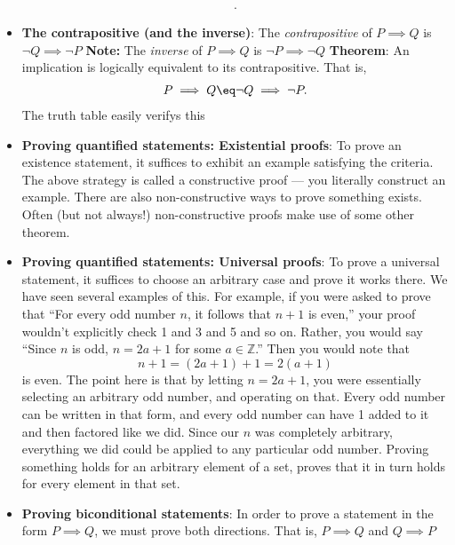\documentclass{report}
\begin{document}
\begin{itemize}
\begin{align*}
        .\end{align*}
    \item \textbf{The contrapositive (and the inverse)}: The \textit{contrapositive} of $P\implies Q$ is $\neg Q \implies \neg P $
        \bigbreak \noindent 
        \textbf{Note:} The \textit{inverse} of $P \implies Q$ is $\neg P \implies \neg Q $
        \bigbreak \noindent 
        \textbf{Theorem}: An implication is logically equivalent to its contrapositive. That is,
        \begin{align*}
            P \implies Q \eq \neg Q \implies \neg P
        .\end{align*}
        The truth table easily verifys this
    \item \textbf{Proving quantified statements: Existential proofs}: To prove an existence statement, it suffices to exhibit an example satisfying the criteria. The above strategy is called a constructive proof — you literally construct an example. There are also non-constructive ways to prove something exists. Often (but not always!) non-constructive proofs make use of some other theorem. 
    \item \textbf{Proving quantified statements: Universal proofs}: To prove a universal statement, it suffices to choose an arbitrary case and prove it works there. We have seen several examples of this. For example, if you were asked to prove that “For every odd number $n$, it follows that $n + 1$ is even,” your proof wouldn’t explicitly check 1 and 3 and 5 and so on. Rather, you would say “Since $n$ is odd, $n = 2a + 1$ for some $a \in \mathbb{Z}$.” Then you would note that 
        \[
            n + 1 = (2a + 1) + 1 = 2(a + 1)
        \]
        is even. The point here is that by letting $n = 2a + 1$, you were essentially selecting an arbitrary odd number, and operating on that. Every odd number can be written in that form, and every odd number can have 1 added to it and then factored like we did. Since our $n$ was completely arbitrary, everything we did could be applied to any particular odd number. Proving something holds for an arbitrary element of a set, proves that it in turn holds for every element in that set.
    \item \textbf{Proving biconditional statements}: In order to prove a statement in the form $P\implies Q$, we must prove both directions. That is, $P\implies Q$ and $Q\implies P $


    \end{itemize}

    \pagebreak 
\end{document}
